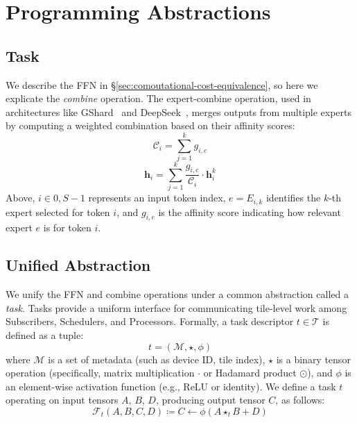 \chapter{Programming Abstractions}\label{ch:abstraction}
\section{Task}\label{sec:task}
We describe the FFN in \S\ref{sec:comoutational-cost-equivalence}, so here we explicate the \emph{combine} operation.
The expert-combine operation, used in architectures like GShard~\cite{DBLP:conf/iclr/LepikhinLXCFHKS21}
and DeepSeek~\cite{deepep}, merges outputs from multiple experts by computing a weighted combination based
on their affinity scores:
\begin{equation}\label{eq:combine1}
\mathcal{C}_i = \sum\limits_{j = 1}^k g_{i, e}
\end{equation}
\begin{equation}\label{eq:combine2}
\mathbf{h}_i = \sum\limits_{j = 1}^k \frac{g_{i, e}}{\mathcal{C}_i}\cdot \mathbf{h}_i^k
\end{equation}
Above, $i \in {0, S - 1}$ represents an input token index, $e = E_{i,k}$ identifies the $k$-th expert
selected for token $i$, and $g_{i,e}$ is the affinity score indicating how relevant expert $e$ is for token $i$.
\section{Unified Abstraction}\label{sec:unified-abstraction}
We unify the FFN and combine operations under a common abstraction called a \emph{task}.
Tasks provide a uniform interface for communicating tile-level work among Subscribers, Schedulers, and Processors.
Formally, a task descriptor $t \in \mathcal{T}$ is defined as a tuple:
\[
    t = (\mathcal{M}, \star, \phi)
\]
where $\mathcal{M}$ is a set of metadata (such as device ID, tile index), $\star$ is a binary tensor operation
(specifically, matrix multiplication $\cdot$ or Hadamard product $\odot$), and $\phi$ is an element-wise activation
function (e.g., ReLU or identity).
We define a task $t$ operating on input tensors $A$, $B$, $D$, producing output tensor $C$, as follows:
\begin{equation}\label{eq:task_def}
\mathcal{F}_t(A, B, C, D) \coloneqq C \gets \phi\left(A \star_t B + D\right)
\end{equation}

